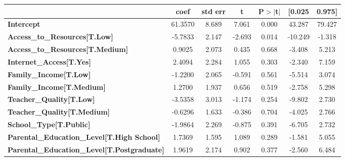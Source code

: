 \documentclass[twocolumn]{article} %
\begin{document}
\begin{figure}[ht]
  \begin{subtable}{\textwidth}
    \centering
    \begin{tabular}{lcccccc}
      & \textbf{coef} & \textbf{std err} & \textbf{t} & \textbf{P$> |$t$|$} & \textbf{[0.025} & \textbf{0.975]}  \\
      \midrule
      \textbf{Intercept}                                  &      61.3570  &        8.689     &     7.061  &         0.000        &       43.287    &       79.427     \\
      \textbf{Access\_to\_Resources[T.Low]}               &      -5.7833  &        2.147     &    -2.693  &         0.014        &      -10.249    &       -1.318     \\
      \textbf{Access\_to\_Resources[T.Medium]}            &       0.9025  &        2.073     &     0.435  &         0.668        &       -3.408    &        5.213     \\
      \textbf{Internet\_Access[T.Yes]}                    &       2.4094  &        2.284     &     1.055  &         0.303        &       -2.340    &        7.159     \\
      \textbf{Family\_Income[T.Low]}                      &      -1.2200  &        2.065     &    -0.591  &         0.561        &       -5.514    &        3.074     \\
      \textbf{Family\_Income[T.Medium]}                   &       1.2700  &        1.937     &     0.656  &         0.519        &       -2.758    &        5.298     \\
      \textbf{Teacher\_Quality[T.Low]}                    &      -3.5358  &        3.013     &    -1.174  &         0.254        &       -9.802    &        2.730     \\
      \textbf{Teacher\_Quality[T.Medium]}                 &      -0.6296  &        1.633     &    -0.386  &         0.704        &       -4.025    &        2.766     \\
      \textbf{School\_Type[T.Public]}                     &      -1.9864  &        2.269     &    -0.875  &         0.391        &       -6.705    &        2.732     \\
      \textbf{Parental\_Education\_Level[T.High School]}  &       1.7369  &        1.595     &     1.089  &         0.289        &       -1.581    &        5.055     \\
      \textbf{Parental\_Education\_Level[T.Postgraduate]} &       1.9619  &        2.174     &     0.902  &         0.377        &       -2.560    &        6.484     \\

\end{tabular}
\end{subtable}
\end{figure}
\end{document}

